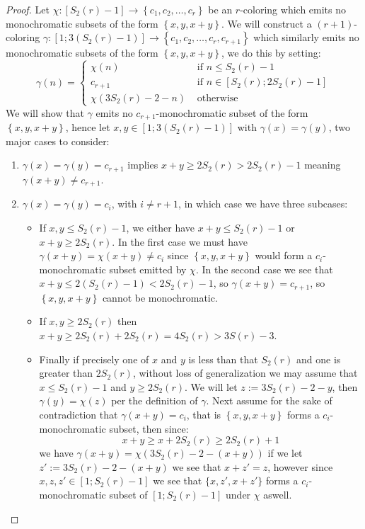 \begin{proof}
	Let $\chi: [S_{2}(r) - 1] \to \left\{c_1, c_2, \ldots, c_{r}\right\}$ be an $r$-coloring which emits no monochromatic subsets of the form $\left\{x, y, x + y\right\}$. We will construct a $(r + 1)$-coloring $\gamma: [1; 3(S_2(r) - 1)] \to \left\{c_1, c_2, \ldots, c_r, c_{r + 1}\right\}$ which similarly emits no monochromatic subsets of the form $\left\{x, y, x + y\right\}$, we do this by setting:
	\begin{equation*}
		\gamma(n) = \begin{cases}
			\chi(n)               & \text{ if }  n \leq S_2(r) - 1          \\
			c_{r + 1}             & \text{ if } n \in [S_2(r); 2S_2(r) - 1] \\
			\chi(3S_2(r) - 2 - n) & \text{ otherwise }
		\end{cases}
	\end{equation*}
	We will show that $\gamma$ emits no $c_{r + 1}$-monochromatic subset of the form $\left\{x, y, x + y\right\}$, hence let $x, y \in [1; 3(S_2(r) - 1)]$ with $\gamma(x) = \gamma(y)$, two major cases to consider:
	\begin{enumerate}
		\item $\gamma(x) = \gamma(y) = c_{r + 1}$ implies $x + y \geq 2S_2(r) > 2S_2(r) - 1$ meaning $\gamma(x + y) \neq c_{r + 1}$.
		\item $\gamma(x) = \gamma(y) = c_{i}$, with $i \neq r + 1$, in which case we have three subcases:
		      \begin{itemize}
			      \item If $x, y \leq S_2(r) - 1$, we either have $x + y \leq S_2(r) - 1$ or $x + y \geq 2S_2(r)$. In the first case we must have $\gamma(x + y) = \chi(x + y) \neq c_{i}$ since $\left\{x, y, x + y\right\}$ would form a $c_i$-monochromatic subset emitted by $\chi$. In the second case we see that $x + y \leq 2(S_2(r) - 1) < 2S_2(r) - 1$, so $\gamma(x + y) = c_{r + 1}$, so $\left\{x, y, x + y\right\}$ cannot be monochromatic.
			      \item If $x, y \geq 2S_2(r)$ then $x + y \geq 2S_2(r) + 2S_2(r) = 4S_2(r) > 3S(r) - 3$.
			      \item Finally if precisely one of $x$ and $y$ is less than that $S_2(r)$ and one is greater than $2S_2(r)$, without loss of generalization we may assume that $x \leq S_2(r) - 1$ and $y \geq 2S_2(r)$. We will let $z := 3S_2(r) - 2 - y$, then $\gamma(y) = \chi(z)$ per the definition of $\gamma$. Next assume for the sake of contradiction that $\gamma(x + y) = c_{i}$, that is $\left\{x, y, x + y\right\}$ forms a $c_i$-monochromatic subset, then since:
			            \begin{equation*}
				            x + y \geq x + 2S_2(r) \geq 2S_2(r) + 1
			            \end{equation*}
			            we have $\gamma(x + y) = \chi(3S_2(r) - 2 - (x + y))$ if we let $z' := 3S_2(r) - 2 - (x + y)$ we see that $x + z' = z$, however since $x, z, z' \in [1; S_2(r) - 1]$ we see that $\{x, z', x + z'\}$ forms a $c_{i}$-monochromatic subset of $[1; S_2(r) - 1]$ under $\chi$ aswell. \qedhere
		      \end{itemize}
	\end{enumerate}
\end{proof}
